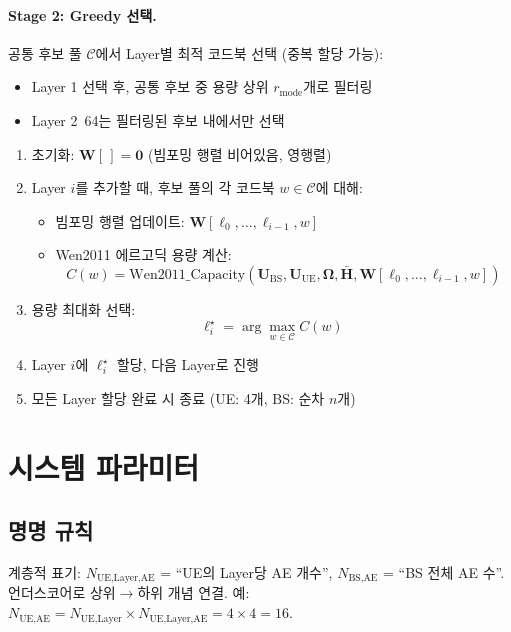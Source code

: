 \documentclass[10pt]{article}
\begin{document}
\paragraph{Stage 2: Greedy 선택.}
공통 후보 풀 $\mathcal{C}$에서 Layer별 최적 코드북 선택 (중복 할당 가능):
\begin{itemize}
    \item Layer 1 선택 후, 공통 후보 중 용량 상위 $r_{\text{mode}}$개로 필터링
    \item Layer 2~64는 필터링된 후보 내에서만 선택
\end{itemize}
\begin{enumerate}
    \item 초기화: $\mathbf{W}[\,] = \mathbf{0}$ (빔포밍 행렬 비어있음, 영행렬)
    \item Layer $i$를 추가할 때, 후보 풀의 각 코드북 $w \in \mathcal{C}$에 대해:
    \begin{itemize}
        \item 빔포밍 행렬 업데이트: $\mathbf{W}[\ell_0, \ldots, \ell_{i-1}, w]$
        \item Wen2011 에르고딕 용량 계산: 
        \begin{equation}
        C(w) = \text{Wen2011\_Capacity}(\mathbf{U}_{\text{BS}}, \mathbf{U}_{\text{UE}}, \boldsymbol{\Omega}, \bar{\mathbf{H}}, \mathbf{W}[\ell_0, \ldots, \ell_{i-1}, w])
        \end{equation}
    \end{itemize}
    \item 용량 최대화 선택:
    \begin{equation}
    \ell_i^{\star} = \arg\max_{w \in \mathcal{C}} C(w)
    \end{equation}
    \item Layer $i$에 $\ell_i^{\star}$ 할당, 다음 Layer로 진행
    \item 모든 Layer 할당 완료 시 종료 (UE: 4개, BS: 순차 $n$개)
\end{enumerate}


\clearpage
\section{시스템 파라미터}

\subsection{명명 규칙}

계층적 표기: $N_{\text{UE,Layer,AE}}$ = ``UE의 Layer당 AE 개수'', $N_{\text{BS,AE}}$ = ``BS 전체 AE 수''. 언더스코어로 상위$\rightarrow$하위 개념 연결. 예: $N_{\text{UE,AE}} = N_{\text{UE,Layer}} \times N_{\text{UE,Layer,AE}} = 4 \times 4 = 16$.
\end{document}
